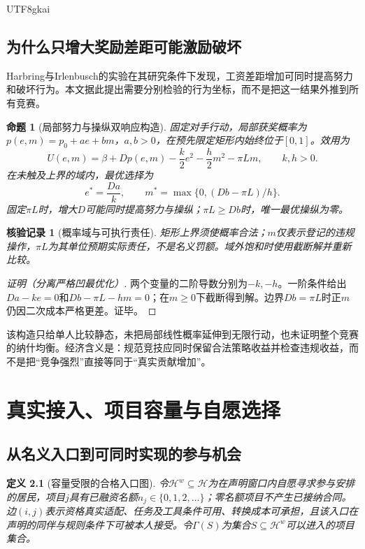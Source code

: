 \documentclass[12pt,a4paper,openany]{report}
\newtheorem{definition}{定义}[chapter]
\newtheorem{proposition}{命题}[chapter]
\newtheorem{Certificate}{核验记录}[chapter]
\newcommand{\HH}{\mathcal H}
\begin{document}
\begin{CJK*}{UTF8}{gkai}
\section{为什么只增大奖励差距可能激励破坏}
Harbring与Irlenbusch的实验在其研究条件下发现，工资差距增加可同时提高努力和破坏行为\cite{Harbring2009}。本文据此提出需要分别检验的行为坐标，而不是把这一结果外推到所有竞赛。
\begin{proposition}[局部努力与操纵双响应构造]
\label{prop:sabotage}
固定对手行动，局部获奖概率为$p(e,m)=p_0+ae+bm$，$a,b>0$，在预先限定矩形内始终位于$[0,1]$。效用为
\[
 U(e,m)=\beta+Dp(e,m)-\frac k2e^2-\frac h2m^2-\pi Lm,
 \qquad k,h>0.
\]
在未触及上界的域内，最优选择为
\[
 e^*=\frac{Da}{k},\qquad m^*=\max\{0,(Db-\pi L)/h\}.
\]
固定$\pi L$时，增大$D$可能同时提高努力与操纵；$\pi L\ge Db$时，唯一最优操纵为零。
\end{proposition}
\begin{Certificate}[概率域与可执行责任]
矩形上界须使概率合法；$m$仅表示登记的违规操作，$\pi L$为其单位预期实际责任，不是名义罚额。域外饱和时使用截断解并重新比较。
\end{Certificate}
\begin{proof}[证明（分离严格凹最优化）]
两个变量的二阶导数分别为$-k,-h$。一阶条件给出$Da-ke=0$和$Db-\pi L-hm=0$；在$m\ge0$下截断得到解。边界$Db=\pi L$时正$m$仍因二次成本严格更差。证毕。
\end{proof}
该构造只给单人比较静态，未把局部线性概率延伸到无限行动，也未证明整个竞赛的纳什均衡。经济含义是：规范竞技应同时保留合法策略收益并检查违规收益，而不是把“竞争强烈”直接等同于“真实贡献增加”。
\chapter{真实接入、项目容量与自愿选择}
\label{chap:access}
\section{从名义入口到可同时实现的参与机会}
\begin{definition}[容量受限的合格入口图]
\label{def:matching}
令$\HH^w\subseteq\HH$为在声明窗口内自愿寻求参与安排的居民，项目$j$具有已融资名额$n_j\in\{0,1,2,\ldots\}$；零名额项目不产生已接纳合同。边$(i,j)$表示资格真实适配、任务及工具条件可用、转换成本可承担，且该入口在声明的同伴与规则条件下可被本人接受。令$\Gamma(S)$为集合$S\subseteq\HH^w$可以进入的项目集合。


\end{definition}
\end{CJK*}
\end{document}

